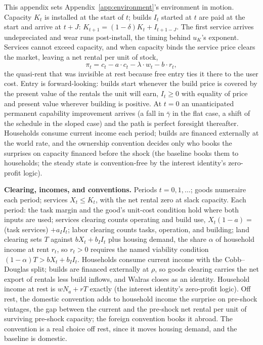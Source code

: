\documentclass[12pt]{article}
\theoremstyle{plain}
\begin{document}
This appendix sets Appendix~\ref{app:environment}'s environment in motion. Capacity $K_t$ is installed at the start of $t$; builds $I_t$ started at $t$ are paid at the start and arrive at $t+J$: $K_{t+1} = (1-\delta )K_t + I_{t+1-J}$. The first service arrives undepreciated and wear runs post-install, the timing behind $u_K$'s exponent. Services cannot exceed capacity, and when capacity binds the service price clears the market, leaving a net rental per unit of stock,
\begin{equation}\label{eq:net-rental}
\pi _t = c_t - a\cdot c_t - \lambda \cdot w_t - b\cdot r_t,
\end{equation}
the quasi-rent that was invisible at rest because free entry ties it there to the user cost. Entry is forward-looking: builds start whenever the build price is covered by the present value of the rentals the unit will earn, $I_t \ge 0$ with equality of price and present value wherever building is positive. At $t = 0$ an unanticipated permanent capability improvement arrives (a fall in $\bar{\gamma}$ in the flat case, a shift of the schedule in the sloped case) and the path is perfect foresight thereafter. Households consume current income each period; builds are financed externally at the world rate, and the ownership convention decides only who books the surprises on capacity financed before the shock (the baseline books them to households; the steady state is convention-free by the interest identity's zero-profit logic).

\textbf{Clearing, incomes, and conventions.} Periods $t = 0, 1, \dots$; goods numeraire each period; services $X_t \le K_t$, with the net rental zero at slack capacity. Each period: the task margin and the good's unit-cost condition hold where both inputs are used; services clearing counts operating and build use, $X_t(1-a) =$ (task services) $+ a_I I_t$; labor clearing counts tasks, operation, and building; land clearing sets $T$ against $bX_t + b_I I_t$ plus housing demand, the share $\alpha$ of household income at rent $r_t$, so $r_t > 0$ requires the named viability condition $(1-\alpha )T > bX_t + b_I I_t$. Households consume current income with the Cobb--Douglas split; builds are financed externally at $\rho$, so goods clearing carries the net export of rentals less build inflows, and Walras closes as an identity. Household income at rest is $wN_a + rT$ exactly (the interest identity's zero-profit logic). Off rest, the domestic convention adds to household income the surprise on pre-shock vintages, the gap between the current and the pre-shock net rental per unit of surviving pre-shock capacity; the foreign convention books it abroad. The convention is a real choice off rest, since it moves housing demand, and the baseline is domestic.
\end{document}
